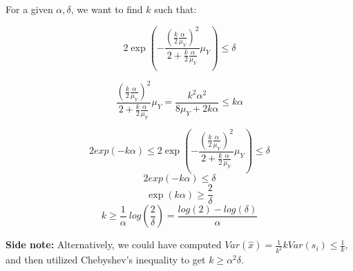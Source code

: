 For a given $\alpha, \delta$, we want to find $k$ such that:

$$ 2 \exp(- \frac{(\frac{k}{2} \frac{\alpha}{\mu_Y})^2}{2 + \frac{k}{2} \frac{\alpha}{\mu_Y}}\mu_Y) \leq \delta $$

$$ \frac{(\frac{k}{2} \frac{\alpha}{\mu_Y})^2}{2 + \frac{k}{2} \frac{\alpha}{\mu_Y}}\mu_Y = \frac{k^2 \alpha^2}{8\mu_Y+2k\alpha} \leq k\alpha$$

$$2 exp(- k\alpha) \leq 2 \exp(- \frac{(\frac{k}{2} \frac{\alpha}{\mu_Y})^2}{2 + \frac{k}{2} \frac{\alpha}{\mu_Y}}\mu_Y) \leq \delta$$
$$2 exp(- k\alpha) \leq \delta $$
$$ \exp(k\alpha) \geq \frac{2}{\delta} $$
$$ k \geq \frac{1}{\alpha}\ log(\frac{2}{\delta}) = \frac{log(2) - log(\delta)}{\alpha}$$

\noindent \textbf{Side note:} Alternatively, we could have computed $Var(\hat{x}) = \frac{1}{k^2}kVar(s_i) \leq \frac{1}{k}$, and then utilized Chebyshev's inequality to get $k \geq \alpha^2 \delta$.
